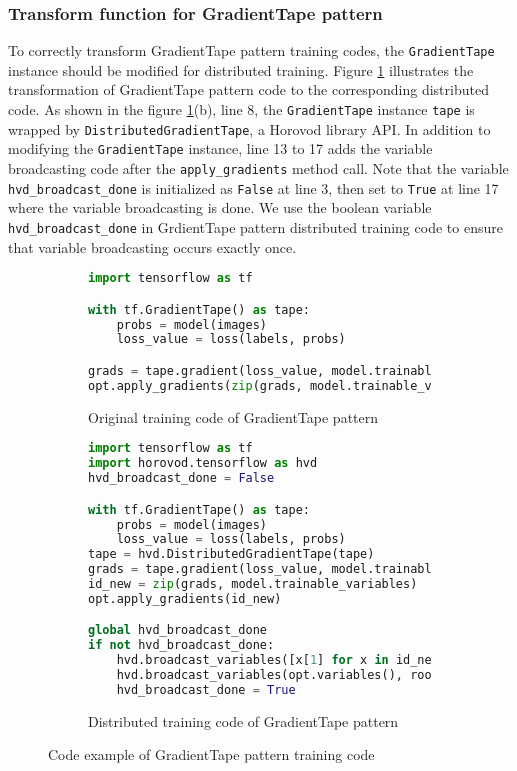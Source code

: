 
\subsubsection{Transform function for GradientTape pattern}

To correctly transform GradientTape pattern training codes,
the {\tt GradientTape} instance should be modified for distributed training.
Figure \ref{fig:trans:gtapetrans} illustrates the transformation of
GradientTape pattern code to the corresponding distributed code.
As shown in the figure \ref{fig:trans:gtapetrans}(b), line 8,
the {\tt GradientTape} instance {\tt tape}
is wrapped by {\tt DistributedGradientTape}, a Horovod library API.
In addition to modifying the {\tt GradientTape} instance,
line 13 to 17 adds the variable broadcasting code after the
{\tt apply\_gradients} method call.
Note that the variable {\tt hvd\_broadcast\_done} is initialized as 
{\tt False} at line 3, 
then set to {\tt True} at line 17 where the variable broadcasting is done. 
We use the boolean variable {\tt hvd\_broadcast\_done} in GrdientTape pattern
distributed training code to ensure that variable broadcasting occurs exactly
once.

\begin{figure}[ht!]
  \centering
  \begin{subfigure}[t]{0.45\textwidth}
    \begin{lstlisting}[language=Python]
import tensorflow as tf

with tf.GradientTape() as tape:
    probs = model(images)
    loss_value = loss(labels, probs)

grads = tape.gradient(loss_value, model.trainable_variables)
opt.apply_gradients(zip(grads, model.trainable_variables))
    \end{lstlisting}
    \caption{Original training code of GradientTape pattern}
  \end{subfigure}
  \hspace{5mm}
  \begin{subfigure}[t]{0.45\textwidth}
    \begin{lstlisting}[language=Python]
import tensorflow as tf
import horovod.tensorflow as hvd
hvd_broadcast_done = False

with tf.GradientTape() as tape:
    probs = model(images)
    loss_value = loss(labels, probs)
tape = hvd.DistributedGradientTape(tape)
grads = tape.gradient(loss_value, model.trainable_variables)
id_new = zip(grads, model.trainable_variables)
opt.apply_gradients(id_new)

global hvd_broadcast_done
if not hvd_broadcast_done:
    hvd.broadcast_variables([x[1] for x in id_new], root_rank=0, )
    hvd.broadcast_variables(opt.variables(), root_rank=0, )
    hvd_broadcast_done = True
    \end{lstlisting}
    \caption{Distributed training code of GradientTape pattern}
  \end{subfigure}
  \caption{Code example of GradientTape pattern training code}
  \label{fig:trans:gtapetrans}
\end{figure}

